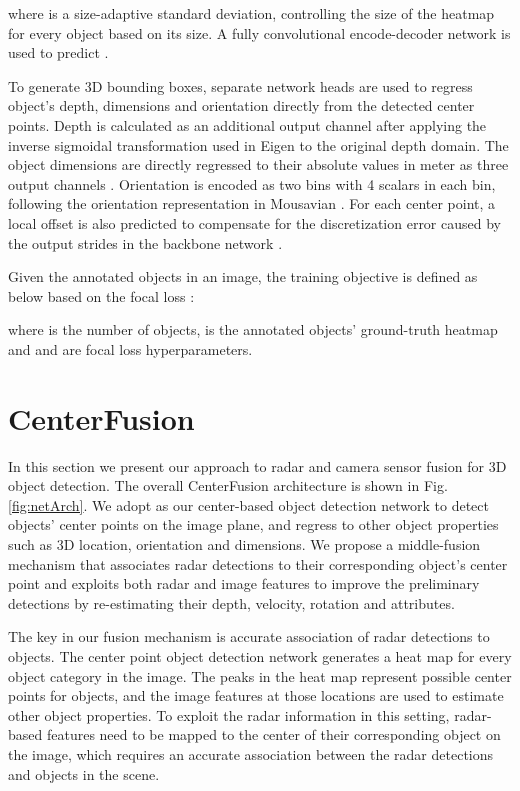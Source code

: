 \documentclass[10pt,twocolumn,letterpaper]{article}
\newcommand\method{CenterFusion}
\begin{document}
   where  is a size-adaptive standard deviation, controlling the size 
   of the heatmap for every object based on its size.
   A fully convolutional encode-decoder network is used to predict .
   
   To generate 3D bounding boxes, separate network heads are used to regress 
   object's depth, dimensions and orientation directly from the detected center 
   points. Depth is calculated as an additional output channel 
    after applying the inverse 
   sigmoidal transformation used in Eigen \etal \cite{eigen2014depth} to the 
   original depth domain. The object dimensions are directly regressed to their 
   absolute values in meter as three output channels 
   . Orientation is 
   encoded as two bins with 4 scalars in each bin, following the orientation 
   representation in Mousavian \etal \cite{mousavian20173d}. For each center point, a 
   local offset is also predicted to compensate for the discretization error 
   caused by the output strides in the backbone network \cite{zhou2019objects}.
   
   Given the annotated objects  in an image, the training objective
   is defined as below based on the focal loss \cite{linFocalLossDense2018}:
   
   \small
   
   \normalsize
   where  is the number of objects, 
    is the annotated 
   objects' ground-truth heatmap and  and  are focal loss 
   hyperparameters.
   
   
   \section{\method{}}
   
   In this section we present our approach to radar and camera sensor fusion for 
   3D object detection. The overall \method{} architecture is
   shown in Fig. \ref{fig:netArch}. We adopt \cite{zhou2019objects} 
   as our center-based object detection network to detect
   objects' center points on the image plane, and regress to other object 
   properties such as 3D location, orientation and dimensions. 
   We propose a middle-fusion mechanism 
   that associates radar detections to their corresponding object's center 
   point and exploits both radar and image features to improve the preliminary
   detections by re-estimating their depth, velocity, rotation and attributes.
   
   The key in our fusion mechanism is accurate association of radar detections 
   to objects. The center point object detection network 
   generates a heat map for every object category in the image. 
   The peaks in the heat map represent possible center points for objects, 
   and the image features at those locations are used to estimate other object 
   properties. To exploit the radar information in this setting, radar-based features
   need to be mapped to the center of their corresponding object on the image,
   which requires an accurate association between the radar detections and objects
   in the scene.
   
\end{document}
